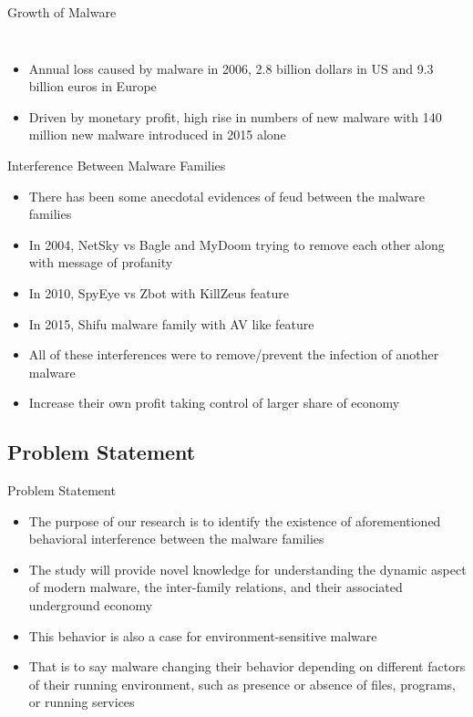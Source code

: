 \documentclass[]{beamer}
\begin{document}
\begin{frame}[plain]{Growth of Malware}
\begin{columns}
\begin{column}{5cm}
\begin{figure}[H]
\begin{center}
        \end{center}
      \end{figure}
    \end{column}
  \end{columns}
  \begin{itemize}
    \item Annual loss caused by malware in 2006, 2.8 billion dollars in US and 9.3 billion euros in Europe
    \item Driven by monetary profit, high rise in numbers of new malware with 140 million new malware introduced in 2015 alone
  \end{itemize}
\end{frame}
\begin{frame}[t]{Interference Between Malware Families}
  \begin{itemize}
    \item There has been some anecdotal evidences of feud between the malware families
    \item In 2004, NetSky vs Bagle and MyDoom trying to remove each other along with message of profanity
    \item In 2010, SpyEye vs Zbot with KillZeus feature
    \item In 2015, Shifu malware family with AV like feature
    \item All of these interferences were to remove/prevent the infection of another malware
    \item Increase their own profit taking control of larger share of economy
  \end{itemize}
\end{frame}
\subsection{Problem Statement}
\label{sub:Problem Statement}
\begin{frame}[t]{Problem Statement}
\begin{itemize}
  \item The purpose of our research is to identify the existence of aforementioned behavioral interference between the malware families
  \item The study will provide novel knowledge for understanding the dynamic aspect of modern malware, the inter-family relations, and their associated underground economy
  \item This behavior is also a case for environment-sensitive malware
  \item That is to say malware changing their behavior depending on different factors of their running environment, such as presence or absence of files, programs, or running services
\end{itemize}
\end{frame}
\end{document}
